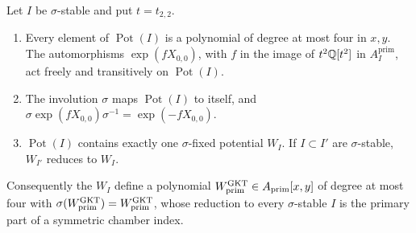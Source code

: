 \begin{lemma}
\label{lem:reflection-fixed}
Let $I$ be $\sigma$-stable and put $t=t_{2,2}$.
\begin{enumerate}
\item Every element of $\operatorname{Pot}(I)$ is a polynomial of degree at most four
in $x,y$.  The automorphisms $\exp(fX_{0,0})$, with $f$ in the image of
$t^2\mathbb Q[t^2]$ in $A^{\mathrm{prim}}_I$, act freely and transitively on
$\operatorname{Pot}(I)$.
\item The involution $\sigma$ maps $\operatorname{Pot}(I)$ to itself, and
$\sigma\exp(fX_{0,0})\sigma^{-1}=\exp(-fX_{0,0})$.
\item $\operatorname{Pot}(I)$ contains exactly one $\sigma$-fixed potential $W_I$.  If
$I\subset I'$ are $\sigma$-stable, $W_{I'}$ reduces to $W_I$.
\end{enumerate}
Consequently the $W_I$ define a polynomial
$W^{\mathrm{GKT}}_{\mathrm{prim}}\in A_{\mathrm{prim}}[x,y]$ of degree at most four with
$\sigma(W^{\mathrm{GKT}}_{\mathrm{prim}})=W^{\mathrm{GKT}}_{\mathrm{prim}}$, whose reduction
to every $\sigma$-stable $I$ is the primary part of a symmetric chamber index.
\end{lemma}

